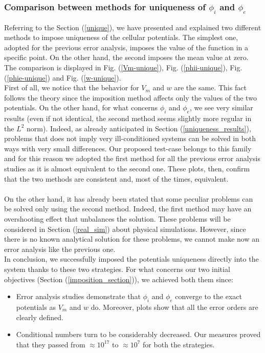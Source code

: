 \documentclass[a4paper,11pt]{article}
\begin{document}
\subsubsection{Comparison between methods for uniqueness of $\phi_i$ and $\phi_e$}
Referring to the Section (\ref{unique}), we have presented and explained two different methods to impose uniqueness of the cellular potentials.
The simplest one, adopted for the previous error analysis, imposes the value of the function in a specific point. On the other hand, the second imposes the mean value at zero. The comparison is displayed in Fig. (\ref{Vm-unique}), Fig. (\ref{phii-unique}), Fig. (\ref{phie-unique}) and Fig. (\ref{w-unique}).\\
\noindent First of all, we notice that the behavior for $V_m$ and $w$ are the same. This fact follows the theory since the imposition method affects only the values of the two potentials. On the other hand, for what concerns $\phi_i$ and $\phi_e$, we see very similar results (even if not identical, the second method seems slightly more regular in the $L^2$ norm). Indeed, as already anticipated in Section (\ref{uniqueness_results}), problems that does not imply very ill-conditioned systems can be solved in both ways with very small differences. Our proposed test-case belongs to this family and for this reason we adopted the first method for all the previous error analysis studies as it is almost equivalent to the second one. These plots, then, confirm that the two methods are consistent and, most of the times, equivalent. \\ \\
On the other hand, it has already been stated that some peculiar problems can be solved only using the second method. Indeed, the first method may have an overshooting effect that unbalances the solution. These problems will be considered in Section (\ref{real_sim}) about physical simulations. However, since there is no known analytical solution for these problems, we cannot make now an error analysis like the previous one.\\ 
\noindent In conclusion, we successfully imposed the potentials uniqueness directly into the system thanks to these two strategies. For what concerns our two initial objectives (Section (\ref{imposition_section})), we achieved both them since:
\begin{itemize}
	\item Error analysis studies demonstrate that $\phi_i$ and $\phi_e$ converge to the exact potentials as $V_m$ and $w$ do. Moreover, plots show that all the error orders are clearly defined.
	\item Conditional numbers turn to be considerably decreased. Our measures proved that they passed from $\approx 10^{17}$ to $\approx 10^{7}$ for both the strategies.
\end{itemize}
\newpage
\end{document}
